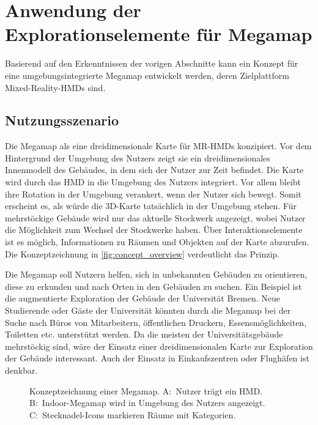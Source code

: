 \section{Anwendung der Explorationselemente für Megamap}
Basierend auf den Erkenntnissen der vorigen Abschnitte kann ein Konzept für eine umgebungsintegrierte Megamap entwickelt werden, deren Zielplattform Mixed-Reality-HMDs sind.

\subsection{Nutzungsszenario}
Die Megamap als eine dreidimensionale Karte für MR-HMDs konzipiert.
Vor dem Hintergrund der Umgebung des Nutzers zeigt sie ein dreidimensionales Innenmodell des Gebäudes, in dem sich der Nutzer zur Zeit befindet.
Die Karte wird durch das HMD in die Umgebung des Nutzers integriert.
Vor allem bleibt ihre Rotation in der Umgebung verankert, wenn der Nutzer sich bewegt.
Somit erscheint es, als würde die 3D-Karte tatsächlich in der Umgebung stehen.
Für mehrstöckige Gebäude wird nur das aktuelle Stockwerk angezeigt, wobei Nutzer die Möglichkeit zum Wechsel der Stockwerke haben.
Über Interaktionselemente ist es möglich, Informationen zu Räumen und Objekten auf der Karte abzurufen.
Die Konzeptzeichnung in \autoref{fig:concept_overview} verdeutlicht das Prinzip.

Die Megamap soll Nutzern helfen, sich in unbekannten Gebäuden zu orientieren, diese zu erkunden und nach Orten in den Gebäuden zu suchen.
Ein Beispiel ist die augmentierte Exploration der Gebäude der Universität Bremen.
Neue Studierende oder Gäste der Universität könnten durch die Megamap bei der Suche nach Büros von Mitarbeitern, öffentlichen Druckern, Essensmöglichkeiten, Toiletten etc. unterstützt werden.
Da die meisten der Universitätsgebäude mehrstöckig sind, wäre der Einsatz einer dreidimensionalen Karte zur Exploration der Gebäude interessant.
Auch der Einsatz in Einkaufszentren oder Flughäfen ist denkbar.
\begin{figure}[bht]
	\centering
	\caption{Konzeptzeichnung einer Megamap. %
		A:~Nutzer trägt ein HMD. %
		B:~Indoor-Megamap wird in Umgebung des Nutzers angezeigt. %
		C:~Stecknadel-Icons markieren Räume mit Kategorien.}
	\label{fig:concept_overview}
\end{figure}

